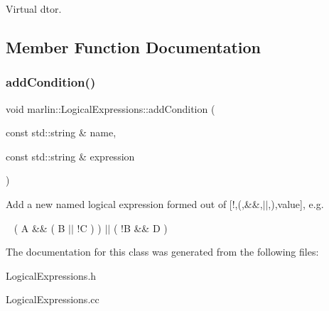 Virtual d\textquotesingle{}tor. 



\subsection{Member Function Documentation}
\mbox{\label{classmarlin_1_1LogicalExpressions_a46ca6fa6d4c76ec7ad18a3500d8ebb0d}} 
\subsubsection{add\+Condition()}
{\footnotesize\ttfamily void marlin\+::\+Logical\+Expressions\+::add\+Condition (\begin{DoxyParamCaption}\item[{const std\+::string \&}]{name,  }\item[{const std\+::string \&}]{expression }\end{DoxyParamCaption})}



Add a new named logical expression formed out of [!,(,\&\&,$\vert$$\vert$,),value], e.\+g. 

~\newline
 ( A \&\& ( B $\vert$$\vert$ !C ) ) $\vert$$\vert$ ( !B \&\& D ) 

The documentation for this class was generated from the following files\+:\begin{DoxyCompactItemize}
\item 
Logical\+Expressions.\+h\item 
Logical\+Expressions.\+cc\end{DoxyCompactItemize}
